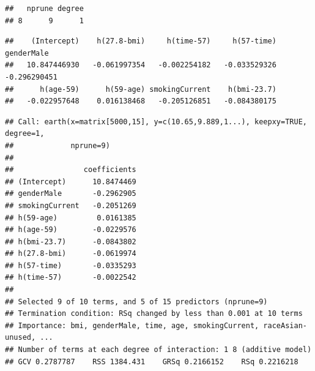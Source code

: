 \documentclass[
]{article}
\newenvironment{Shaded}{\begin{snugshade}}{\end{snugshade}}
\newcommand{\FunctionTok}[1]{\textcolor[rgb]{0.13,0.29,0.53}{\textbf{#1}}}
\newcommand{\NormalTok}[1]{#1}
\newcommand{\SpecialCharTok}[1]{\textcolor[rgb]{0.81,0.36,0.00}{\textbf{#1}}}
\begin{document}
\begin{verbatim}
##   nprune degree
## 8      9      1
\end{verbatim}

\begin{Shaded}
\end{Shaded}

\begin{verbatim}
##    (Intercept)    h(27.8-bmi)     h(time-57)     h(57-time)     genderMale 
##   10.847446930   -0.061997354   -0.002254182   -0.033529326   -0.296290451 
##      h(age-59)      h(59-age) smokingCurrent    h(bmi-23.7) 
##   -0.022957648    0.016138468   -0.205126851   -0.084380175
\end{verbatim}

\begin{Shaded}
\end{Shaded}

\begin{verbatim}
## Call: earth(x=matrix[5000,15], y=c(10.65,9.889,1...), keepxy=TRUE, degree=1,
##             nprune=9)
## 
##                coefficients
## (Intercept)      10.8474469
## genderMale       -0.2962905
## smokingCurrent   -0.2051269
## h(59-age)         0.0161385
## h(age-59)        -0.0229576
## h(bmi-23.7)      -0.0843802
## h(27.8-bmi)      -0.0619974
## h(57-time)       -0.0335293
## h(time-57)       -0.0022542
## 
## Selected 9 of 10 terms, and 5 of 15 predictors (nprune=9)
## Termination condition: RSq changed by less than 0.001 at 10 terms
## Importance: bmi, genderMale, time, age, smokingCurrent, raceAsian-unused, ...
## Number of terms at each degree of interaction: 1 8 (additive model)
## GCV 0.2787787    RSS 1384.431    GRSq 0.2166152    RSq 0.2216218
\end{verbatim}
\end{document}
